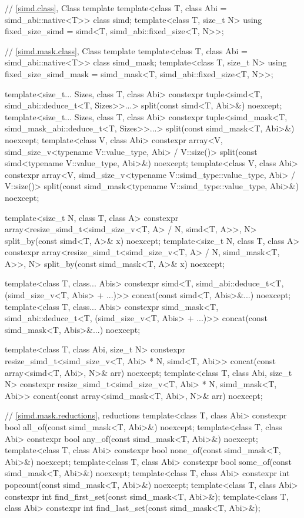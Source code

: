\begin{codeblock}
{  // \ref{simd.class}, Class template 
  template<class T, class Abi = simd_abi::native<T>> class simd;
  template<class T, size_t N> using fixed_size_simd = simd<T, simd_abi::fixed_size<T, N>>;

  // \ref{simd.mask.class}, Class template 
  template<class T, class Abi = simd_abi::native<T>> class simd_mask;
  template<class T, size_t N> using fixed_size_simd_mask = simd_mask<T, simd_abi::fixed_size<T, N>>;

  template<size_t... Sizes, class T, class Abi>
    constexpr tuple<simd<T, simd_abi::deduce_t<T, Sizes>>...>
      split(const simd<T, Abi>&) noexcept;
  template<size_t... Sizes, class T, class Abi>
    constexpr tuple<simd_mask<T, simd_mask_abi::deduce_t<T, Sizes>>...>
      split(const simd_mask<T, Abi>&) noexcept;
  template<class V, class Abi>
    constexpr array<V, simd_size_v<typename V::value_type, Abi> / V::size()>
      split(const simd<typename V::value_type, Abi>&) noexcept;
  template<class V, class Abi>
    constexpr array<V, simd_size_v<typename V::simd_type::value_type, Abi> / V::size()>
      split(const simd_mask<typename V::simd_type::value_type, Abi>&) noexcept;

  template<size_t N, class T, class A>
    constexpr array<resize_simd_t<simd_size_v<T, A> / N, simd<T, A>>, N>
      split_by(const simd<T, A>& x) noexcept;
  template<size_t N, class T, class A>
    constexpr array<resize_simd_t<simd_size_v<T, A> / N, simd_mask<T, A>>, N>
      split_by(const simd_mask<T, A>& x) noexcept;

  template<class T, class... Abis>
    constexpr simd<T, simd_abi::deduce_t<T, (simd_size_v<T, Abis> + ...)>>
      concat(const simd<T, Abis>&...) noexcept;
  template<class T, class... Abis>
    constexpr simd_mask<T, simd_abi::deduce_t<T, (simd_size_v<T, Abis> + ...)>>
      concat(const simd_mask<T, Abis>&...) noexcept;

  template<class T, class Abi, size_t N>
    constexpr resize_simd_t<simd_size_v<T, Abi> * N, simd<T, Abi>>
      concat(const array<simd<T, Abi>, N>& arr) noexcept;
  template<class T, class Abi, size_t N>
    constexpr resize_simd_t<simd_size_v<T, Abi> * N, simd_mask<T, Abi>>
      concat(const array<simd_mask<T, Abi>, N>& arr) noexcept;

  // \ref{simd.mask.reductions},  reductions
  template<class T, class Abi> constexpr bool all_of(const simd_mask<T, Abi>&) noexcept;
  template<class T, class Abi> constexpr bool any_of(const simd_mask<T, Abi>&) noexcept;
  template<class T, class Abi> constexpr bool none_of(const simd_mask<T, Abi>&) noexcept;
  template<class T, class Abi> constexpr bool some_of(const simd_mask<T, Abi>&) noexcept;
  template<class T, class Abi> constexpr int popcount(const simd_mask<T, Abi>&) noexcept;
  template<class T, class Abi> constexpr int find_first_set(const simd_mask<T, Abi>&);
  template<class T, class Abi> constexpr int find_last_set(const simd_mask<T, Abi>&);

}
\end{codeblock}
